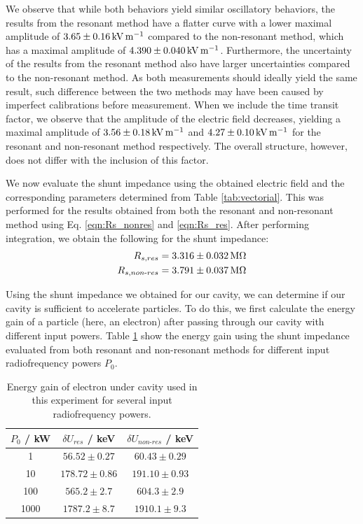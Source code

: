 \documentclass[a4paper]{report}
\numberwithin{equation}{section}
\begin{document}
We observe that while both behaviors yield similar oscillatory behaviors, the results from the resonant method have a 
flatter curve with a lower maximal amplitude of $\SI{3.65 \pm 0.16}{\kilo\volt\per\metre}$ compared to the non-resonant method, which has
a maximal amplitude of $\SI{4.390 \pm 0.040}{\kilo\volt\per\metre}$. Furthermore, the uncertainty of the results from the resonant
method also have larger uncertainties compared to the non-resonant method. As both measurements should ideally yield the same result,
such difference between the two methods may have been caused by imperfect calibrations before measurement. When we include the time transit factor,
 we observe that the amplitude of the electric field decreases, yielding a maximal amplitude of  $\SI{3.56 \pm 0.18}{\kilo\volt\per\metre}$
 and $\SI{4.27 +- 0.10}{\kilo\volt\per\metre}$ for the resonant and non-resonant method respectively. The overall structure, however,
 does not differ with the inclusion of this factor.\par 

We now evaluate the shunt impedance using the obtained electric field and the corresponding parameters determined from Table \ref{tab:vectorial}.
This was performed for the results obtained from both the resonant and non-resonant method using Eq. \ref{eqn:Rs_nonres} and \ref{eqn:Rs_res}.
After performing integration, we obtain the following for the shunt impedance:
\begin{align*}
	R_{s, res} = \SI{3.316 \pm 0.032}{\mega\ohm} \\
	R_{s, non\text{-}res} = \SI{3.791 \pm 0.037}{\mega\ohm}
\end{align*}

Using the shunt impedance we obtained for our cavity, we can determine if our cavity is sufficient to accelerate particles. To do this,
we first calculate the energy gain of a particle (here, an electron) after passing through our cavity with different input powers.
Table \ref{tab:energy_gain} show the energy gain using the shunt impedance evaluated from both resonant and non-resonant methods for 
different input radiofrequency powers $P_0$.

\begin{table}[h!]
	\centering
	\begin{tabular}{|c|c|c|}
		\hline $P_0$ / kW & $\delta U_{res}$ / keV & $\delta U_{non\text{-}res}$ / keV \\
		\hline 1 & $56.52 \pm 0.27$ & $60.43 \pm 0.29$ \\ 
		\hline 10 & $178.72 \pm 0.86$ & $191.10 \pm 0.93$ \\ 
		\hline 100 & $565.2 \pm 2.7$ & $604.3 \pm 2.9$ \\ 
		\hline 1000 & $1787.2 \pm 8.7$ & $1910.1 \pm 9.3$ \\ 
		\hline
	\end{tabular}
	\caption{Energy gain of electron under cavity used in this experiment for several input radiofrequency powers.}
	\label{tab:energy_gain}
\end{table}
\end{document}
